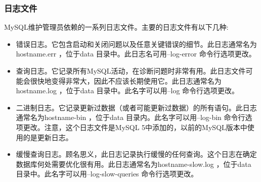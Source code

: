 \subsubsection{日志文件}

MySQL维护管理员依赖的一系列日志文件。主要的日志文件有以下几种:

\begin{itemize}
    \item 错误日志。它包含启动和关闭问题以及任意关键错误的细节。此日志通常名为hostname.err ，位于data 目录中。此日志名可用--log-error 命令行选项更改。
    \item 查询日志。它记录所有MySQL活动，在诊断问题时非常有用。此日志文件可能会很快地变得非常大，因此不应该长期使用它。此日志通常名为hostname.log ，位于data 目录中。此名字可以用--log 命令行选项更改。
    \item 二进制日志。它记录更新过数据（或者可能更新过数据）的所有语句。此日志通常名为hostname-bin ，位于data 目录内。此名字可以用--log-bin 命令行选项更改。注意，这个日志文件是MySQL 5中添加的，以前的MySQL版本中使用的是更新日志。
    \item 缓慢查询日志。顾名思义，此日志记录执行缓慢的任何查询。这个日志在确定数据库何处需要优化很有用。此日志通常名为hostname-slow.log ，位于data 目录中。此名字可以用--log-slow-queries 命令行选项更改。
\end{itemize}